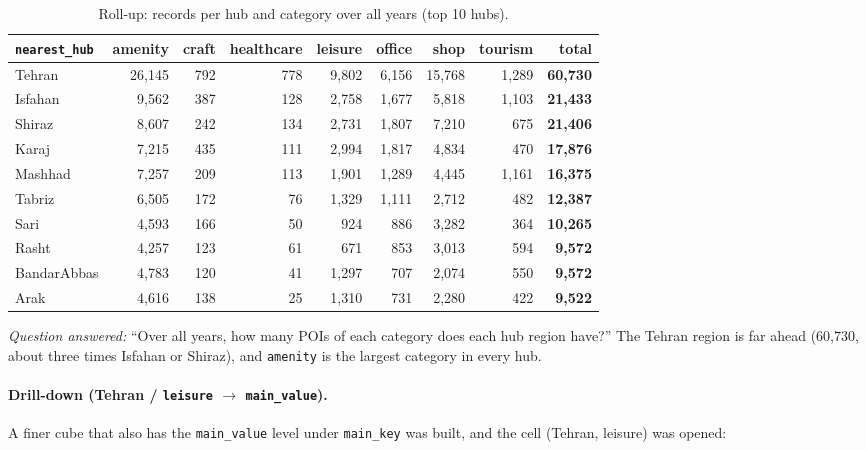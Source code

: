\documentclass[11pt,a4paper]{article}
\newcommand{\col}[1]{\texttt{#1}}
\begin{document}
\begin{table}[H]
\centering\small
\caption{Roll-up: records per hub and category over all years (top 10 hubs).}
\begin{tabular}{lrrrrrrrr}
\toprule
\col{nearest\_hub} & amenity & craft & healthcare & leisure & office & shop & tourism & \textbf{total} \\
\midrule
Tehran      & 26{,}145 & 792 & 778 & 9{,}802 & 6{,}156 & 15{,}768 & 1{,}289 & \textbf{60{,}730} \\
Isfahan     & 9{,}562  & 387 & 128 & 2{,}758 & 1{,}677 & 5{,}818  & 1{,}103 & \textbf{21{,}433} \\
Shiraz      & 8{,}607  & 242 & 134 & 2{,}731 & 1{,}807 & 7{,}210  & 675     & \textbf{21{,}406} \\
Karaj       & 7{,}215  & 435 & 111 & 2{,}994 & 1{,}817 & 4{,}834  & 470     & \textbf{17{,}876} \\
Mashhad     & 7{,}257  & 209 & 113 & 1{,}901 & 1{,}289 & 4{,}445  & 1{,}161 & \textbf{16{,}375} \\
Tabriz      & 6{,}505  & 172 & 76  & 1{,}329 & 1{,}111 & 2{,}712  & 482     & \textbf{12{,}387} \\
Sari        & 4{,}593  & 166 & 50  & 924     & 886     & 3{,}282  & 364     & \textbf{10{,}265} \\
Rasht       & 4{,}257  & 123 & 61  & 671     & 853     & 3{,}013  & 594     & \textbf{9{,}572} \\
BandarAbbas & 4{,}783  & 120 & 41  & 1{,}297 & 707     & 2{,}074  & 550     & \textbf{9{,}572} \\
Arak        & 4{,}616  & 138 & 25  & 1{,}310 & 731     & 2{,}280  & 422     & \textbf{9{,}522} \\
\bottomrule
\end{tabular}
\end{table}

\noindent\textit{Question answered:} ``Over all years, how many POIs of each category does each
hub region have?'' The Tehran region is far ahead (60{,}730, about three times Isfahan or Shiraz),
and \col{amenity} is the largest category in every hub.

\paragraph{Drill-down (Tehran / \col{leisure} $\rightarrow$ \col{main\_value}).}
A finer cube that also has the \col{main\_value} level under \col{main\_key} was built, and
the cell (Tehran, leisure) was opened:
\end{document}

